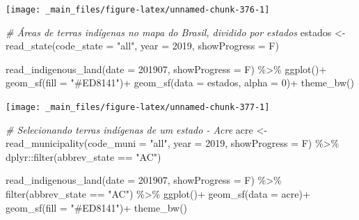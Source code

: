 \documentclass[
  brazilian,
]{book}
\newenvironment{Shaded}{\begin{snugshade}}{\end{snugshade}}
\newcommand{\AttributeTok}[1]{\textcolor[rgb]{0.77,0.63,0.00}{#1}}
\newcommand{\CommentTok}[1]{\textcolor[rgb]{0.56,0.35,0.01}{\textit{#1}}}
\newcommand{\DecValTok}[1]{\textcolor[rgb]{0.00,0.00,0.81}{#1}}
\newcommand{\FunctionTok}[1]{\textcolor[rgb]{0.00,0.00,0.00}{#1}}
\newcommand{\NormalTok}[1]{#1}
\newcommand{\OtherTok}[1]{\textcolor[rgb]{0.56,0.35,0.01}{#1}}
\newcommand{\SpecialCharTok}[1]{\textcolor[rgb]{0.00,0.00,0.00}{#1}}
\newcommand{\StringTok}[1]{\textcolor[rgb]{0.31,0.60,0.02}{#1}}
\begin{document}
\begin{center}\texttt{[image: \_main\_files/figure-latex/unnamed-chunk-376-1]} \end{center}

\begin{Shaded}
\begin{Highlighting}[]
\CommentTok{\# Áreas de terras indígenas no mapa do Brasil, dividido por estados}
\NormalTok{estados }\OtherTok{\textless{}{-}} \FunctionTok{read\_state}\NormalTok{(}\AttributeTok{code\_state =} \StringTok{"all"}\NormalTok{,}
                      \AttributeTok{year =} \DecValTok{2019}\NormalTok{,}
                      \AttributeTok{showProgress =}\NormalTok{ F)}


\FunctionTok{read\_indigenous\_land}\NormalTok{(}\AttributeTok{date =} \DecValTok{201907}\NormalTok{,}
                     \AttributeTok{showProgress =}\NormalTok{ F) }\SpecialCharTok{\%\textgreater{}\%} 
  \FunctionTok{ggplot}\NormalTok{()}\SpecialCharTok{+}
  \FunctionTok{geom\_sf}\NormalTok{(}\AttributeTok{fill =} \StringTok{"\#ED8141"}\NormalTok{)}\SpecialCharTok{+}
  \FunctionTok{geom\_sf}\NormalTok{(}\AttributeTok{data =}\NormalTok{ estados, }\AttributeTok{alpha =} \DecValTok{0}\NormalTok{)}\SpecialCharTok{+}
  \FunctionTok{theme\_bw}\NormalTok{()}
\end{Highlighting}
\end{Shaded}

\begin{center}\texttt{[image: \_main\_files/figure-latex/unnamed-chunk-377-1]} \end{center}

\begin{Shaded}
\begin{Highlighting}[]
\CommentTok{\# Selecionando terras indígenas de um estado {-} Acre}
\NormalTok{acre }\OtherTok{\textless{}{-}} \FunctionTok{read\_municipality}\NormalTok{(}\AttributeTok{code\_muni =} \StringTok{"all"}\NormalTok{,}
                          \AttributeTok{year =} \DecValTok{2019}\NormalTok{,}
                          \AttributeTok{showProgress =}\NormalTok{ F) }\SpecialCharTok{\%\textgreater{}\%} 
\NormalTok{  dplyr}\SpecialCharTok{::}\FunctionTok{filter}\NormalTok{(abbrev\_state }\SpecialCharTok{==} \StringTok{"AC"}\NormalTok{)}

\FunctionTok{read\_indigenous\_land}\NormalTok{(}\AttributeTok{date =} \DecValTok{201907}\NormalTok{,}
                     \AttributeTok{showProgress =}\NormalTok{ F) }\SpecialCharTok{\%\textgreater{}\%} 
  \FunctionTok{filter}\NormalTok{(abbrev\_state }\SpecialCharTok{==} \StringTok{"AC"}\NormalTok{) }\SpecialCharTok{\%\textgreater{}\%} 
  \FunctionTok{ggplot}\NormalTok{()}\SpecialCharTok{+}
  \FunctionTok{geom\_sf}\NormalTok{(}\AttributeTok{data =}\NormalTok{ acre)}\SpecialCharTok{+}
  \FunctionTok{geom\_sf}\NormalTok{(}\AttributeTok{fill =} \StringTok{"\#ED8141"}\NormalTok{)}\SpecialCharTok{+}
  \FunctionTok{theme\_bw}\NormalTok{()}
\end{Highlighting}
\end{Shaded}
\end{document}
